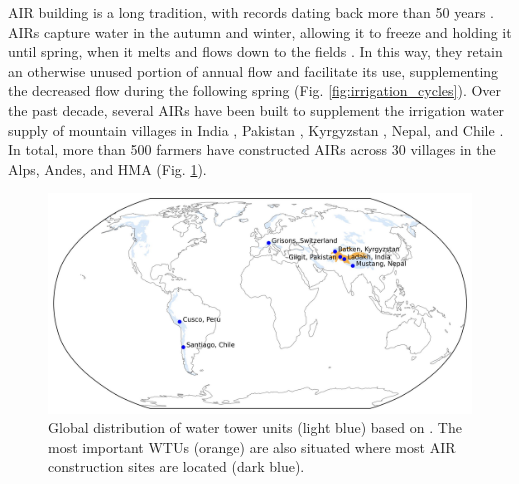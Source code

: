 \ac{AIR} building is a long tradition, with records dating back more than 50 years
\citep{nusserSociohydrologyArtificialGlaciers2019}. \ac{AIRs} capture water in the autumn and winter, allowing
it to freeze and holding it until spring, when it melts and flows down to the fields
\citep{ipccChapterHighMountain2019, vinceGlacierMan2009, clouseLadakhArtificialGlaciers2017,
nusserSociohydrologyArtificialGlaciers2019}. In this way, they retain an otherwise unused portion of annual
flow and facilitate its use, supplementing the decreased flow during the following spring (Fig.
\ref{fig:irrigation_cycles}). Over the past decade, several \ac{AIRs} have been built to supplement the
irrigation water supply of mountain villages in India \citep{wangchukIceStupaCompetition2020,
palmerStoringFrozenWater2022, aggarwalAdaptationClimateChange2021}, Pakistan
\citep{awazproductionIceStupaArtificial2022}, Kyrgyzstan \citep{bbcnewsBrightArtificialGlacier2020}, Nepal, and
Chile \citep{reutersConservationistsChileAim2021}. In total, more than 500 farmers have constructed \ac{AIRs} across
30 villages in the Alps, Andes, and \ac{HMA} (Fig. \ref{fig:WTUs_AIRs}).

\begin{figure}[htb]
	\centering
	\includegraphics[width=\textwidth]{figs/WTUs_AIRs.jpg}

	\caption{ Global distribution of water tower units (light blue) based on
		\citet{immerzeelImportanceVulnerabilityWorld2020}. The most important \ac{WTUs} (orange) are also situated where most 
		AIR construction sites  are located (dark blue). }

	\label{fig:WTUs_AIRs}
\end{figure}


